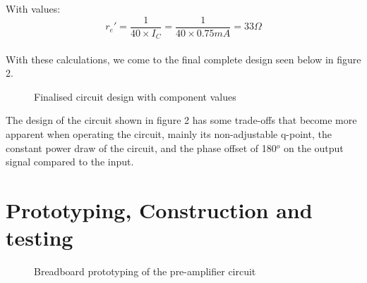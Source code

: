 \documentclass[a4paper,11pt]{article}
\begin{document}
With values: $$r_e ' = \frac{1}{40\times I_C} = \frac{1}{40\times 0.75mA} = 33\Omega$$\\

With these calculations, we come to the final complete design seen below in figure 2.

\begin{figure}[h]
 \begin{center}
  \vspace{-8pt}
  \caption{Finalised circuit design with component values}
  \vspace{-15pt}
 \end{center}
\end{figure}

\pagebreak

The design of the circuit shown in figure 2 has some trade-offs that become more apparent when operating the circuit, mainly its non-adjustable q-point, the constant power draw of the circuit, and the phase offset of 180$^o$ on the output signal compared to the input. 
 
\section{Prototyping, Construction and testing } 

\begin{figure}
\vspace{-40pt}
\begin{center}
\end{center}
\vspace{-8pt}
\caption{Breadboard prototyping of the pre-amplifier circuit}
\end{figure}
\end{document}
